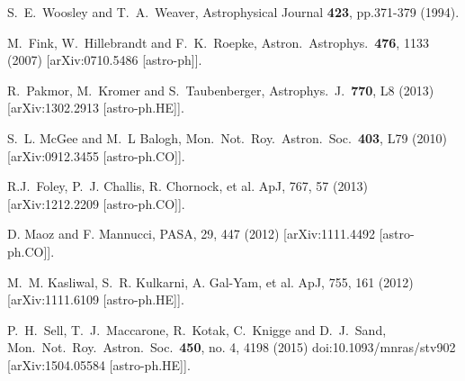   S.~E.~Woosley and T.~A.~Weaver, Astrophysical Journal {\bf 423}, pp.371-379 (1994).

  M.~Fink, W.~Hillebrandt and F.~K.~Roepke,
  Astron.\ Astrophys.\  {\bf 476}, 1133 (2007)
  [arXiv:0710.5486 [astro-ph]].

  R.~Pakmor, M.~Kromer and S.~Taubenberger,
  Astrophys.\ J.\  {\bf 770}, L8 (2013)
  [arXiv:1302.2913 [astro-ph.HE]].

  S.~L. McGee and M.~L Balogh,
  Mon.\ Not.\ Roy.\ Astron.\ Soc.\  {\bf 403}, L79 (2010)
  [arXiv:0912.3455 [astro-ph.CO]].

  R.J.~Foley, P.~J. Challis, R. Chornock, et al.
  ApJ, 767, 57 (2013)
  [arXiv:1212.2209 [astro-ph.CO]].

  D. Maoz and F. Mannucci,
  PASA, 29, 447 (2012)
  [arXiv:1111.4492 [astro-ph.CO]].

  M.~M. Kasliwal, S.~R. Kulkarni, A. Gal-Yam, et al.
  ApJ, 755, 161 (2012)
  [arXiv:1111.6109 [astro-ph.HE]].

  P.~H.~Sell, T.~J.~Maccarone, R.~Kotak, C.~Knigge and D.~J.~Sand,
  Mon.\ Not.\ Roy.\ Astron.\ Soc.\  {\bf 450}, no. 4, 4198 (2015)
  doi:10.1093/mnras/stv902
  [arXiv:1504.05584 [astro-ph.HE]].

